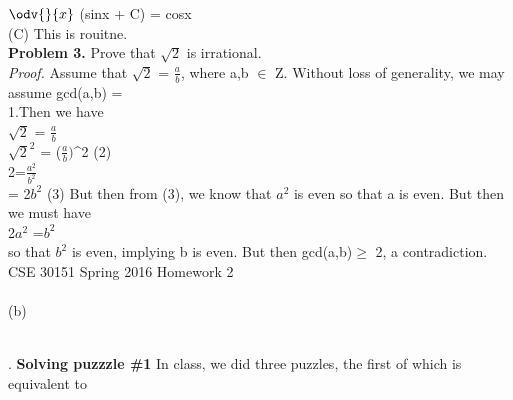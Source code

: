 \documentclass{knittingpattern}
\begin{document}
\hspace{5cm}$\odv{}{x}$ (sinx + C) = cosx\\
\smallskip
(C) This is rouitne.\\
\bigskip
\textbf{Problem 3.} Prove that $\sqrt{2}$ is irrational.\\
\bigskip
\textit{Proof.} Assume that $\sqrt{2}$ = $\frac{a}{b}$, where a,b $\in$ Z. Without loss of generality, we may assume gcd(a,b) = \\
1.Then we have\\
\hspace{5cm}$\sqrt{2}$ = $\frac{a}{b}$\\
\smallskip
\hspace{5cm}${\sqrt{2}}^{2}$ = {($\frac{a}{b})$}^{2} \hspace{6cm}(2)\\
\smallskip
\hspace{5cm}2=$\frac{a^{2}}{b^{2}}$\\
\smallskip
{} = 2${b^{2}}$ \hspace{6.5cm}(3)
\medskip
But then from (3), we know that ${a^{2}}$ is even so that a is even. But then we must have \\
\medskip
\hspace{5cm} 2${a^{2}}$ =${b^{2}}$\\
\medskip
so that ${b^{2}}$ is even, implying b is even. But then gcd(a,b)$\ge$ 2, a contradiction.\\
\bigskip
\newpage
CSE 30151 Spring 2016 \hspace{11cm} Homework 2\\
\hrulefill\\
\bigskip
(b) \hspace{1cm}\\
\smallskip
\hspace{1cm}
\\
. \textbf{Solving puzzzle \#1} In class, we did three puzzles, the first of which is equivalent to
\end{document}
